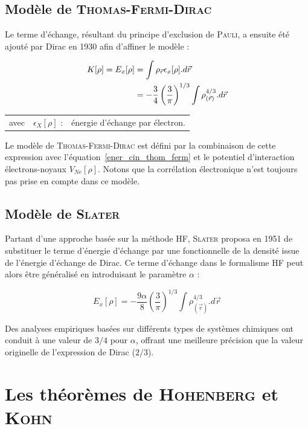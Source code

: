 \subsection{Modèle de \textsc{Thomas-Fermi-Dirac}}

Le terme d'échange, résultant du principe d'exclusion de \textsc{Pauli}, a ensuite été ajouté par Dirac en 1930 afin d'affiner le modèle :

\begin{align}
K[\rho] = E_{x}[\rho] &= \int \rho_{\vec{r}} \epsilon_{x}[\rho] .d\vec{r} \\
&= -\frac{3}{4} \left(\frac{3}{\pi}\right)^{1/3} \int \rho_{(\vec{r})}^{4/3} .d\vec{r} \notag
\end{align}

\begin{flushleft}
\begin{tabular}{@{}lrp{10cm}}
avec & $\epsilon_{X}[\rho]$ : & énergie d'échange par électron. 
\end{tabular}
\end{flushleft}

Le modèle de \textsc{Thomas-Fermi-Dirac} est défini par la combinaison de cette expression avec l'équation~\ref{ener_cin_thom_ferm} et le potentiel d'interaction électrons-noyaux $V_{Ne}[\rho]$. Notons que la corrélation électronique n'est toujours pas prise en compte dans ce modèle.

\subsection{Modèle de \textsc{Slater}}

Partant d'une approche basée sur la méthode HF, \textsc{Slater} proposa en 1951 de substituer le terme d'énergie d'échange par une fonctionnelle de la densité issue de l'énergie d'échange de Dirac. Ce terme d'échange dans le formalisme HF peut alors être généralisé en introduisant le paramètre $\alpha$ :

\begin{equation}
E_{x}[\rho] = - \frac{9\alpha}{8} \left(\frac{3}{\pi}\right)^{1/3} \int \rho_{(\vec{r})}^{4/3} .d\vec{r}
\end{equation}

Des analyses empiriques basées sur différents types de systèmes chimiques ont conduit à une valeur de $3/4$ pour $\alpha$, offrant une meilleure précision que la valeur originelle de l'expression de Dirac ($2/3$).

\section{Les théorèmes de \textsc{Hohenberg} et \textsc{Kohn}}

